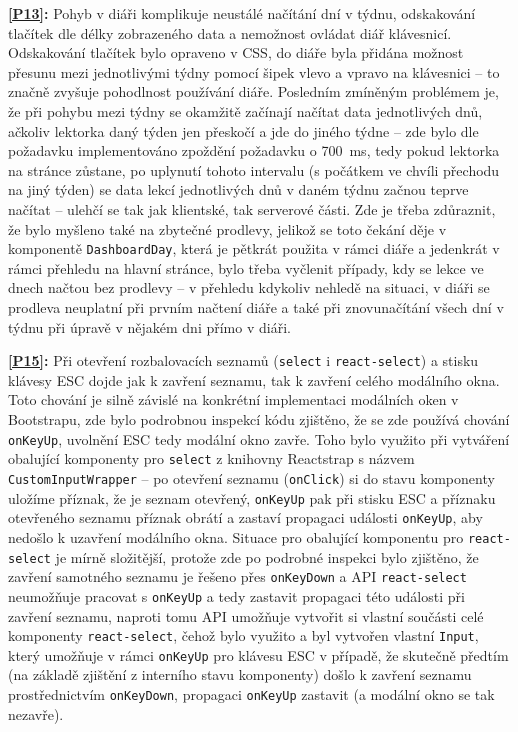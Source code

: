 \textbf{\ref{P13}:} Pohyb v diáři komplikuje neustálé načítání dní v týdnu, odskakování tlačítek dle délky zobrazeného data a nemožnost ovládat diář klávesnicí. Odskakování tlačítek bylo opraveno v CSS, do diáře byla přidána možnost přesunu mezi jednotlivými týdny pomocí šipek vlevo a vpravo na klávesnici -- to značně zvyšuje pohodlnost používání diáře. Posledním zmíněným problémem je, že při pohybu mezi týdny se okamžitě začínají načítat data jednotlivých dnů, ačkoliv lektorka daný týden jen přeskočí a jde do jiného týdne -- zde bylo dle požadavku implementováno zpoždění požadavku o 700~ms, tedy pokud lektorka na stránce zůstane, po uplynutí tohoto intervalu (s počátkem ve chvíli přechodu na jiný týden) se data lekcí jednotlivých dnů v daném týdnu začnou teprve načítat -- ulehčí se tak jak klientské, tak serverové části. Zde je třeba zdůraznit, že bylo myšleno také na zbytečné prodlevy, jelikož se toto čekání děje v komponentě \verb|DashboardDay|, která je pětkrát použita v rámci diáře a jedenkrát v rámci přehledu na hlavní stránce, bylo třeba vyčlenit případy, kdy se lekce ve dnech načtou bez prodlevy -- v přehledu kdykoliv nehledě na situaci, v diáři se prodleva neuplatní při prvním načtení diáře a také při znovunačítání všech dní v týdnu při úpravě v nějakém dni přímo v diáři.

\textbf{\ref{P15}:} Při otevření rozbalovacích seznamů (\verb|select| i \verb|react-select|) a stisku klávesy ESC dojde jak k zavření seznamu, tak k zavření celého modálního okna. Toto chování je silně závislé na konkrétní implementaci modálních oken v Bootstrapu, zde bylo podrobnou inspekcí kódu zjištěno, že se zde používá chování \verb|onKeyUp|, uvolnění ESC tedy modální okno zavře. Toho bylo využito při vytváření obalující komponenty pro \verb|select| z knihovny Reactstrap s názvem \verb|CustomInputWrapper| -- po otevření seznamu (\verb|onClick|) si do stavu komponenty uložíme příznak, že je seznam otevřený, \verb|onKeyUp| pak při stisku ESC a příznaku otevřeného seznamu příznak obrátí a zastaví propagaci události \verb|onKeyUp|, aby nedošlo k uzavření modálního okna. Situace pro obalující komponentu pro \verb|react-select| je mírně složitější, protože zde po podrobné inspekci bylo zjištěno, že zavření samotného seznamu je řešeno přes \verb|onKeyDown| a API \verb|react-select| neumožňuje pracovat s \verb|onKeyUp| a tedy zastavit propagaci této události při zavření seznamu, naproti tomu API umožňuje vytvořit si vlastní součásti celé komponenty \verb|react-select|, čehož bylo využito a byl vytvořen vlastní \verb|Input|, který umožňuje v rámci \verb|onKeyUp| pro klávesu ESC v případě, že skutečně předtím (na základě zjištění z interního stavu komponenty) došlo k zavření seznamu prostřednictvím \verb|onKeyDown|, propagaci \verb|onKeyUp| zastavit (a modální okno se tak nezavře).

